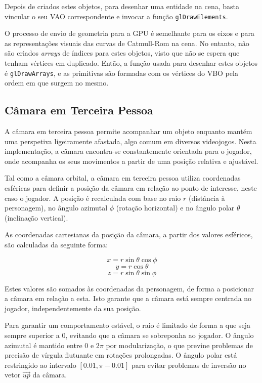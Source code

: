 \documentclass[12pt, a4paper]{article}
\begin{document}
Depois de criados estes objetos, para desenhar uma entidade na cena, basta vincular o seu VAO
correspondente e invocar a função \texttt{glDrawElements}.

O processo de envio de geometria para a GPU é semelhante para os eixos e para as representações
visuais das curvas de Catmull-Rom na cena. No entanto, não são criados \emph{arrays} de índices para
estes objetos, visto que não se espera que tenham vértices em duplicado. Então, a função usada para
desenhar estes objetos é \texttt{glDrawArrays}, e as primitivas são formadas com os vértices do VBO
pela ordem em que surgem no mesmo.

\subsection{Câmara em Terceira Pessoa}

A câmara em terceira pessoa permite acompanhar um objeto enquanto mantém uma
perspetiva ligeiramente afastada, algo comum em diversos videojogos. Nesta implementação, a câmara
encontra-se constantemente orientada para o jogador, onde acompanha os seus movimentos a partir de
uma posição relativa e ajustável.

Tal como a câmara orbital, a câmara em terceira pessoa utiliza coordenadas esféricas para definir a
posição da câmara em relação ao ponto de interesse, neste caso o jogador. A posição é recalculada
com base no raio $r$ (distância à personagem), no ângulo azimutal $\phi$ (rotação horizontal) e no
ângulo polar $\theta$ (inclinação vertical).

As coordenadas cartesianas da posição da câmara, a partir dos valores esféricos, são calculadas da
seguinte forma:

$$x = r \sin \theta \cos \phi$$
$$y = r \cos \theta$$
$$z = r \sin \theta \sin \phi$$

Estes valores são somados às coordenadas da personagem, de forma a posicionar a câmara em relação
a esta. Isto garante que a câmara está sempre centrada no jogador, independentemente da sua
posição.

Para garantir um comportamento estável, o raio é limitado de forma a que seja sempre superior a $0$,
evitando que a câmara se sobreponha ao jogador. O ângulo azimutal é mantido entre $0$ e $2\pi$ por
modularização, o que previne problemas de precisão de vírgula flutuante em rotações prolongadas.
O ângulo polar está restringido ao intervalo $[0.01, \pi - 0.01]$ para evitar problemas de inversão
no vetor $\vec{up}$ da câmara.
\end{document}
